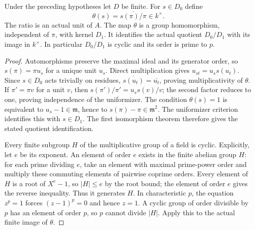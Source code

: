 \begin{lemma}
\label{fw:tame-inertia-quotient}
\leanok
Under the preceding hypotheses let $D$ be finite.
For $s\in D_0$ define
\[
 \theta(s)=\overline{s(\pi)/\pi}\in k^\times.
\]
The ratio is an actual unit of $A$. The map $\theta$ is a group
homomorphism, independent of $\pi$, with kernel $D_1$.
It identifies the actual quotient $D_0/D_1$ with its image in
$k^\times$. In particular $D_0/D_1$ is cyclic and its order is
prime to $p$.
\end{lemma}
\begin{proof}
Automorphisms preserve the maximal ideal and its generator order,
so $s(\pi)=\pi u_s$ for a unique unit $u_s$. Direct multiplication
gives $u_{st}=u_s s(u_t)$. Since $s\in D_0$ acts trivially on
residues, $\overline{s(u_t)}=\overline{u_t}$, proving
multiplicativity of $\theta$. If $\pi'=\pi v$ for a unit $v$,
then $s(\pi')/\pi'=u_s s(v)/v$; the second factor reduces to one,
proving independence of the uniformizer.
The condition $\theta(s)=1$ is equivalent to
$u_s-1\in\mathfrak m$, hence to
$s(\pi)-\pi\in\mathfrak m^2$. The uniformizer criterion
identifies this with $s\in D_1$. The first isomorphism theorem
therefore gives the stated quotient identification.

Every finite subgroup $H$ of the multiplicative group of a field
is cyclic. Explicitly, let $e$ be its exponent. An element of order
$e$ exists in the finite abelian group $H$: for each prime dividing
$e$, take an element with maximal prime-power order and multiply
these commuting elements of pairwise coprime orders. Every element
of $H$ is a root of $X^e-1$, so $|H|\leq e$ by the root bound;
the element of order $e$ gives the reverse inequality. Thus it
generates $H$. In characteristic $p$, the equation $z^p=1$
forces $(z-1)^p=0$ and hence $z=1$. A cyclic group of order
divisible by $p$ has an element of order $p$, so $p$ cannot divide
$|H|$. Apply this to the actual finite image of $\theta$.
\end{proof}

